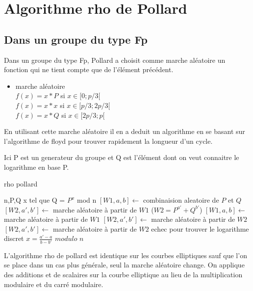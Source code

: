 \documentclass[a4paper,10pt]{report}
\begin{document}
\section{Algorithme rho de Pollard}

\subsection{Dans un groupe du type Fp}

Dans un groupe du type Fp, Pollard a choisit comme marche aléatoire un fonction qui ne tient compte que de l'élément précédent.\\

\begin{itemize}
\item{marche aléatoire}\\
{
$ f(x) = x*P$ si $x \in [0;p/3[$\\
$ f(x) = x*x$ si $x \in [p/3;2p/3[$\\
$ f(x) = x*Q$ si $x \in [2p/3;p[$\\
}
\end{itemize}

En utilisant cette marche aléatoire il en a deduit un algorithme en se basant sur l'algorithme de floyd pour trouver rapidement la longueur d'un cycle.

Ici P est un generateur du groupe et Q est l'élément dont on veut connaitre le logarithme en base P.

{
 \begin{algorithm}
 \caption{rho pollard}
 \begin{algorithmic}
  \REQUIRE n,P,Q
  \ENSURE x tel que Q = $P^x$ mod n
    \STATE $[W1,a,b] \leftarrow$ combinaision aleatoire de $P$ et $Q$
    \STATE $[W2,a',b'] \leftarrow$  marche aléatoire à partir de $W1$
	\STATE ($W2 = P^{a'} + Q^{b'}$)
      \STATE $[W1,a,b] \leftarrow$ marche aléatoire à partir de $W1$
      \STATE $[W2,a',b'] \leftarrow$ marche aléatoire à partir de $W2$
      \STATE $[W2,a',b'] \leftarrow$ marche aléatoire à partir de $W2$
    \ENDWHILE
    \STATE echec pour trouver le logarithme discret
  \ELSE
    \STATE $ x = \frac{a'-a}{b-b'}$ $modulo$ $n$
  \ENDIF
 
 \end{algorithmic}
 \end{algorithm}
 }


L'algorithme rho de pollard est identique sur les courbes elliptiques sauf que l'on se place dans un cas plus générale,
seul la marche aléatoire change. On applique des additions et de scalaires sur la courbe elliptique au lieu de la multiplication modulaire et du carré modulaire.
\end{document}
